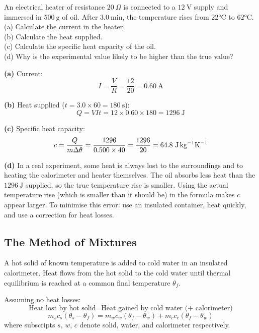 \begin{examplebox}[15.2]
An electrical heater of resistance $20\ \Omega$ is
connected to a $12\ \text{V}$ supply and immersed in
$500\ \text{g}$ of oil. After $3.0\ \text{min}$, the
temperature rises from $22°\text{C}$ to $62°\text{C}$.\\
(a) Calculate the current in the heater.\\
(b) Calculate the heat supplied.\\
(c) Calculate the specific heat capacity of the oil.\\
(d) Why is the experimental value likely to be
higher than the true value?
\end{examplebox}

\begin{solutionbox}
\textbf{(a)} Current:
\[
  I = \frac{V}{R} = \frac{12}{20} = 0.60\ \text{A}
\]

\textbf{(b)} Heat supplied ($t = 3.0 \times 60
= 180\ \text{s}$):
\[
  Q = VIt = 12 \times 0.60 \times 180
  = 1296\ \text{J}
\]

\textbf{(c)} Specific heat capacity:
\[
  c = \frac{Q}{m\Delta\theta}
  = \frac{1296}{0.500 \times 40}
  = \frac{1296}{20}
  = 64.8\ \text{J\,kg}^{-1}\text{K}^{-1}
\]

\textbf{(d)} In a real experiment, some heat is
always lost to the surroundings and to heating the
calorimeter and heater themselves. The oil absorbs
less heat than the $1296\ \text{J}$ supplied,
so the true temperature rise is smaller. Using the
actual temperature rise (which is smaller than it
should be) in the formula makes $c$ appear larger.
To minimise this error: use an insulated container,
heat quickly, and use a correction for heat losses.
\end{solutionbox}

\subsection{The Method of Mixtures}

\begin{processbox}
A hot solid of known temperature is added to cold
water in an insulated calorimeter. Heat flows from
the hot solid to the cold water until thermal
equilibrium is reached at a common final temperature
$\theta_f$.

Assuming no heat losses:
\[
  \text{Heat lost by hot solid}
  = \text{Heat gained by cold water (+ calorimeter)}
\]
\[
  m_s c_s(\theta_s - \theta_f)
  = m_w c_w(\theta_f - \theta_w)
  + m_c c_c(\theta_f - \theta_w)
\]
where subscripts $s$, $w$, $c$ denote solid,
water, and calorimeter respectively.
\end{processbox}

